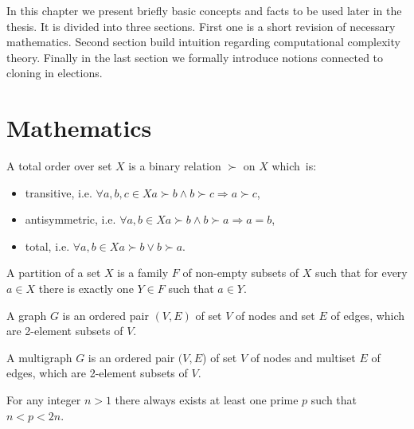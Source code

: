 In this chapter we present briefly basic concepts and facts to be used later in the thesis.
It is divided into three sections.
First one is a short revision of necessary mathematics.
Second section build intuition regarding computational complexity theory.
Finally in the last section we formally introduce notions connected to cloning in elections.

\section{Mathematics}

\begin{defn}
A total order over set $X$ is a binary relation $\succ$ on $X$ which~is:
\begin{itemize}
	\item transitive, i.e. $\forall a,b,c \in X a \succ b \land b \succ c \Rightarrow a \succ c$,
	\item antisymmetric, i.e. $\forall a,b \in X a \succ b \land b \succ a \Rightarrow a=b $,
	\item total, i.e. $\forall a,b \in X a \succ b \lor b \succ a$.
\end{itemize}
\end{defn}


\begin{defn}
A partition of a set $X$ is a family $F$ of non-empty subsets of $X$
such that for every $a \in X$ there is exactly one $Y \in F$ such that $a \in Y$.
\end{defn}


\begin{defn}
A graph $G$ is an ordered pair $(V,E)$ of set $V$ of nodes
and set $E$ of edges, which are 2-element subsets of $V$.
\end{defn}

\begin{defn}
A multigraph $G$ is an ordered pair $(V,E$) of set $V$ of nodes
and multiset $E$ of edges, which are 2-element subsets of $V$.
\end{defn}




\begin{thm}
For any integer $n>1$ there always exists at least one prime $p$ such that $n < p < 2n$.
\end{thm}



